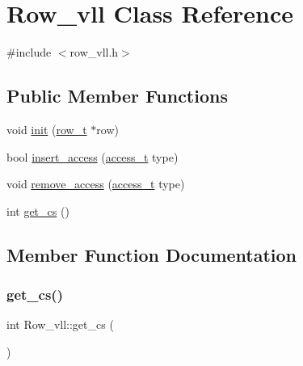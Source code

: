 \hypertarget{classRow__vll}{}\section{Row\+\_\+vll Class Reference}
\label{classRow__vll}


{\ttfamily \#include $<$row\+\_\+vll.\+h$>$}

\subsection*{Public Member Functions}
\begin{DoxyCompactItemize}
\item 
void \hyperlink{classRow__vll_a09b47d6a9a9ffbd124b4f212cfe94956}{init} (\hyperlink{classrow__t}{row\+\_\+t} $\ast$row)
\item 
bool \hyperlink{classRow__vll_a35de5541a336e6c59ec3858e43d6cf71}{insert\+\_\+access} (\hyperlink{global_8h_a567f81b0ae33b00d189d7714e9fde0bc}{access\+\_\+t} type)
\item 
void \hyperlink{classRow__vll_a9a5897c79cbccb910326d48b274a8fc4}{remove\+\_\+access} (\hyperlink{global_8h_a567f81b0ae33b00d189d7714e9fde0bc}{access\+\_\+t} type)
\item 
int \hyperlink{classRow__vll_a1b3fc8fe7f0e1793a5cf34ca45c973e1}{get\+\_\+cs} ()
\end{DoxyCompactItemize}


\subsection{Member Function Documentation}
\mbox{\label{classRow__vll_a1b3fc8fe7f0e1793a5cf34ca45c973e1}} 
\subsubsection{\texorpdfstring{get\+\_\+cs()}{get\_cs()}}
{\footnotesize\ttfamily int Row\+\_\+vll\+::get\+\_\+cs (\begin{DoxyParamCaption}{ }\end{DoxyParamCaption})\hspace{0.3cm}{\ttfamily [inline]}}

\mbox{\label{classRow__vll_a09b47d6a9a9ffbd124b4f212cfe94956}} 
